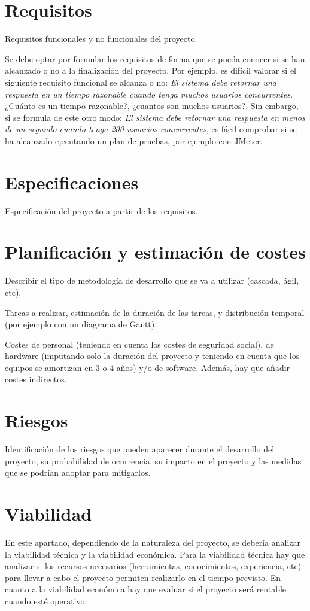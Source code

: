 
\section{Requisitos}
Requisitos funcionales y no funcionales del proyecto.

Se debe optar por formular los requisitos de forma que se pueda
conocer si se han alcanzado o no a la finalización del proyecto. Por
ejemplo, es difícil valorar si el siguiente requisito funcional se
alcanza o no: \textit{El sistema debe retornar una respuesta en un tiempo
razonable cuando tenga muchos usuarios concurrentes}. ¿Cuánto es un
tiempo razonable?, ¿cuantos son muchos usuarios?. Sin embargo, si se
formula de este otro modo: \textit{El sistema debe retornar una
respuesta en menos de un segundo cuando tenga 200 usuarios
concurrentes}, es fácil comprobar si se ha alcanzado ejecutando un
plan de pruebas, por ejemplo con JMeter.

\section{Especificaciones}
Especificación del proyecto a partir de los requisitos.

\section{Planificación y estimación de costes}
Describir el tipo de metodología de desarrollo que se va a utilizar
(cascada, ágil, etc).

Tareas a realizar, estimación de la duración de las tareas, y
distribución temporal (por ejemplo con un diagrama de Gantt).

Costes de personal (teniendo en cuenta los costes de seguridad
social), de hardware (imputando solo la duración del proyecto y teniendo
en cuenta que los equipos se amortizan en 3 o 4 años) y/o de software.
Además, hay que añadir costes indirectos.

\section{Riesgos}

Identificación de los riesgos que pueden aparecer durante el
desarrollo del proyecto, su probabilidad de ocurrencia, su impacto en
el proyecto y las medidas que se podrían adoptar para mitigarlos.

\section{Viabilidad}
En este apartado, dependiendo de la naturaleza del proyecto, se
debería analizar la viabilidad técnica y la viabilidad económica. Para
la viabilidad técnica hay que analizar si los recursos
necesarios (herramientas, conocimientos, experiencia, etc)  para llevar
a cabo el proyecto permiten realizarlo en el tiempo previsto.
En cuanto a la viabilidad económica hay que evaluar si el proyecto
será rentable cuando esté operativo.
